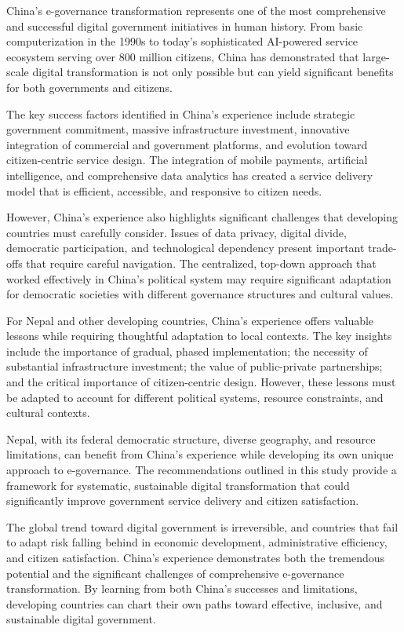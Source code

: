 \documentclass[12pt,a4paper]{article}
\begin{document}
China's e-governance transformation represents one of the most comprehensive and successful digital government initiatives in human history. From basic computerization in the 1990s to today's sophisticated AI-powered service ecosystem serving over 800 million citizens, China has demonstrated that large-scale digital transformation is not only possible but can yield significant benefits for both governments and citizens.

The key success factors identified in China's experience include strategic government commitment, massive infrastructure investment, innovative integration of commercial and government platforms, and evolution toward citizen-centric service design. The integration of mobile payments, artificial intelligence, and comprehensive data analytics has created a service delivery model that is efficient, accessible, and responsive to citizen needs.

However, China's experience also highlights significant challenges that developing countries must carefully consider. Issues of data privacy, digital divide, democratic participation, and technological dependency present important trade-offs that require careful navigation. The centralized, top-down approach that worked effectively in China's political system may require significant adaptation for democratic societies with different governance structures and cultural values.

For Nepal and other developing countries, China's experience offers valuable lessons while requiring thoughtful adaptation to local contexts. The key insights include the importance of gradual, phased implementation; the necessity of substantial infrastructure investment; the value of public-private partnerships; and the critical importance of citizen-centric design. However, these lessons must be adapted to account for different political systems, resource constraints, and cultural contexts.

Nepal, with its federal democratic structure, diverse geography, and resource limitations, can benefit from China's experience while developing its own unique approach to e-governance. The recommendations outlined in this study provide a framework for systematic, sustainable digital transformation that could significantly improve government service delivery and citizen satisfaction.

The global trend toward digital government is irreversible, and countries that fail to adapt risk falling behind in economic development, administrative efficiency, and citizen satisfaction. China's experience demonstrates both the tremendous potential and the significant challenges of comprehensive e-governance transformation. By learning from both China's successes and limitations, developing countries can chart their own paths toward effective, inclusive, and sustainable digital government.
\end{document}
